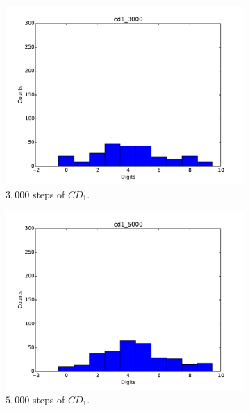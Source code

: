 \begin{figure}[hbt]
\begin{subfigure}[t]{0.18\textwidth}
  			\includegraphics[width=\textwidth]{pics_sdbn/gibbs_cd1_3000.pdf}
  		    \caption{$3,000$ steps of $CD_1$.}
  		\end{subfigure}
  		\begin{subfigure}[t]{0.18\textwidth}
  			\includegraphics[width=\textwidth]{pics_sdbn/gibbs_cd1_5000.pdf}
  		    \caption{$5,000$ steps of $CD_1$.}
  		\end{subfigure}
  		\begin{subfigure}[t]{0.18\textwidth}

\end{subfigure}
\end{figure}
